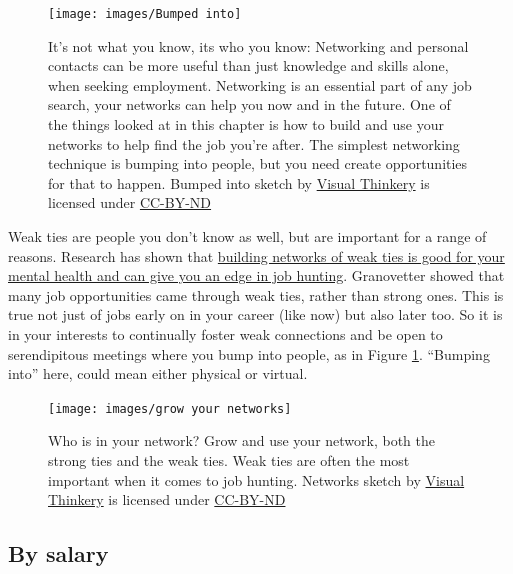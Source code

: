 \documentclass[
]{book}
\begin{document}
\begin{figure}

{\centering \texttt{[image: images/Bumped into]} 

}

\caption{It's not what you know, its who you know: Networking and personal contacts can be more useful than just knowledge and skills alone, when seeking employment. Networking is an essential part of any job search, your networks can help you now and in the future. One of the things looked at in this chapter is how to build and use your networks to help find the job you're after. The simplest networking technique is bumping into people, but you need create opportunities for that to happen. Bumped into sketch by \href{https://visualthinkery.com/}{Visual Thinkery} is licensed under \href{https://creativecommons.org/licenses/by-nd/4.0/}{CC-BY-ND}}\label{fig:bumped-fig}
\end{figure}



Weak ties are people you don't know as well, but are important for a range of reasons. Research has shown that \href{https://www.bbc.com/worklife/article/20200701-why-your-weak-tie-friendships-may-mean-more-than-you-think}{building networks of weak ties is good for your mental health and can give you an edge in job hunting}. \citep{weakties} Granovetter showed that many job opportunities came through weak ties, rather than strong ones. This is true not just of jobs early on in your career (like now) but also later too. So it is in your interests to continually foster weak connections and be open to serendipitous meetings where you bump into people, as in Figure \ref{fig:bumped-fig}. ``Bumping into'' here, could mean either physical or virtual.

\begin{figure}

{\centering \texttt{[image: images/grow your networks]} 

}

\caption{Who is in your network? Grow and use your network, both the strong ties and the weak ties. Weak ties are often the most important when it comes to job hunting. Networks sketch by \href{https://visualthinkery.com/}{Visual Thinkery} is licensed under \href{https://creativecommons.org/licenses/by-nd/4.0/}{CC-BY-ND}}\label{fig:net-fig}
\end{figure}



\hypertarget{by-salary}{%
\subsection{By salary}\label{by-salary}}
\end{document}

